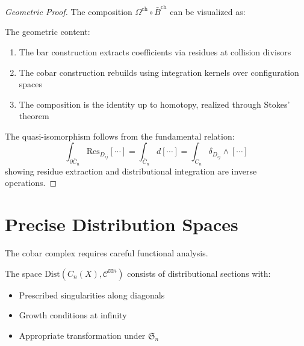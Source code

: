 \begin{proof}[Geometric Proof]
The composition $\Omega^{\text{ch}} \circ \bar{B}^{\text{ch}}$ can be visualized as:

\begin{center}
\end{center}

The geometric content:
\begin{enumerate}
\item The bar construction extracts coefficients via residues at collision divisors
\item The cobar construction rebuilds using integration kernels over configuration spaces
\item The composition is the identity up to homotopy, realized through Stokes' theorem
\end{enumerate}

The quasi-isomorphism follows from the fundamental relation:
\[
\int_{\partial \overline{C}_n} \text{Res}_{D_{ij}}[\cdots] = \int_{\overline{C}_n} d[\cdots] = \int_{C_n} \delta_{D_{ij}} \wedge [\cdots]
\]
showing residue extraction and distributional integration are inverse operations.
\end{proof}

\section{Precise Distribution Spaces}

The cobar complex requires careful functional analysis.

\begin{definition}
The space $\text{Dist}(C_n(X), \mathcal{C}^{\boxtimes n})$ consists of distributional sections with:
\begin{itemize}
\item Prescribed singularities along diagonals
\item Growth conditions at infinity
\item Appropriate transformation under $\mathfrak{S}_n$
\end{itemize}
\end{definition}

